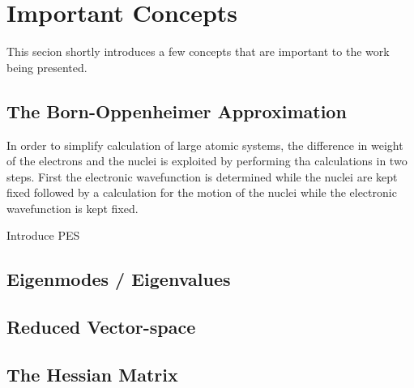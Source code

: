 \section{Important Concepts}
\label{sec:important-concepts}

This secion shortly introduces a few concepts that are important to the work being presented.

\incomplete
\subsection{The Born-Oppenheimer Approximation}
\label{sec:born-oppenheimer}

In order to simplify calculation of large atomic systems, the difference in weight of the electrons and the nuclei is exploited by performing tha calculations in two steps.
First the electronic wavefunction is determined while the nuclei are kept fixed followed by a calculation for the motion of the nuclei while the electronic wavefunction is kept fixed.

\bit
\item Introduce PES
\eit

\incomplete

\subsection{Eigenmodes / Eigenvalues}
\label{sec:eigenmodes}

\placeholder

\subsection{Reduced Vector-space}
\label{sec:reduced-space}

\placeholder

\subsection{The Hessian Matrix}
\label{sec:hessian}

